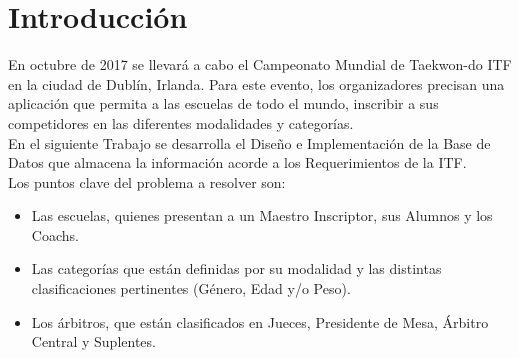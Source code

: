 \section{Introducci\'on}

En octubre de 2017 se llevará a cabo el Campeonato Mundial de Taekwon-do ITF en la ciudad de Dublín, Irlanda. Para este evento, los organizadores precisan una aplicación que permita a las escuelas de todo el mundo, inscribir a sus competidores en las diferentes modalidades y categorías.\\

En el siguiente Trabajo se desarrolla el Dise\~no e Implementaci\'on de la Base de Datos que almacena la informaci\'on acorde a los Requerimientos de la ITF.\\

Los puntos clave del problema a resolver son:
\begin{itemize}
\item Las escuelas, quienes presentan a un Maestro Inscriptor, sus Alumnos y los Coachs.
\item Las categor\'ias que est\'an definidas por su modalidad y las distintas clasificaciones pertinentes (G\'enero, Edad y/o Peso).
\item Los \'arbitros, que est\'an clasificados en Jueces, Presidente de Mesa, \'Arbitro Central y Suplentes.
\end{itemize}

